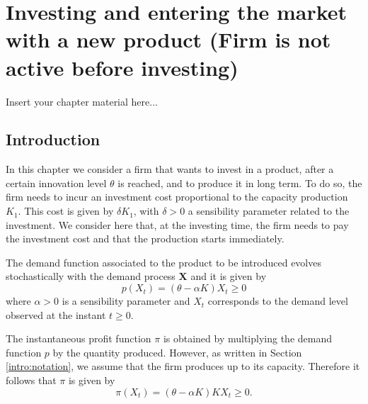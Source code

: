 


\chapter{Investing and entering the market with a new product (Firm is not active before investing)}
\label{chapter:background}

Insert your chapter material here...


\section{Introduction}
\label{section:overview}

In this chapter we consider a firm that wants to invest in a product, after a certain innovation level $\theta$ is reached, and to produce it in long term. To do so, the firm needs to incur an investment cost proportional to the capacity production $K_1$. This cost is given by $\delta K_1$, with $\delta>0$ a sensibility parameter related to the investment. We consider here that, at the investing time, the firm needs to pay the investment cost and that the production starts immediately.


The demand function associated to the product to be introduced evolves stochastically with the demand process \textbf{X} and it is given by
\begin{equation}
p(X_t)=(\theta-\alpha K) X_t \geq 0
\label{prob1:pi}
\end{equation}
where $\alpha>0$ is a sensibility parameter and $X_t$ corresponds to the demand level observed at the instant $t\geq0$.

The instantaneous profit function $\pi$ is obtained by multiplying the demand function $p$ by the quantity produced. However, as written in Section \ref{intro:notation}, we assume that the firm produces up to its capacity. Therefore it follows that $\pi$ is given by
\begin{equation}
\pi(X_t)=(\theta-\alpha K)K X_t \geq 0.
\label{prob1:pi}
\end{equation}


